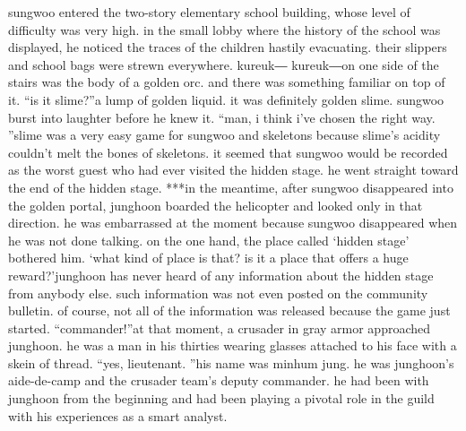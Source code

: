 sungwoo entered the two-story elementary school building, whose level of difficulty was very high.
 in the small lobby where the history of the school was displayed, he noticed the traces of the children hastily evacuating.
 their slippers and school bags were strewn everywhere.
kureuk― kureuk―on one side of the stairs was the body of a golden orc.
 and there was something familiar on top of it.
“is it slime?”a lump of golden liquid.
 it was definitely golden slime.
 sungwoo burst into laughter before he knew it.
“man, i think i’ve chosen the right way.
”slime was a very easy game for sungwoo and skeletons because slime’s acidity couldn’t melt the bones of skeletons.
it seemed that sungwoo would be recorded as the worst guest who had ever visited the hidden stage.
he went straight toward the end of the hidden stage.
***in the meantime, after sungwoo disappeared into the golden portal, junghoon boarded the helicopter and looked only in that direction.
he was embarrassed at the moment because sungwoo disappeared when he was not done talking.
 on the one hand, the place called ‘hidden stage’ bothered him.
‘what kind of place is that? is it a place that offers a huge reward?’junghoon has never heard of any information about the hidden stage from anybody else.
 such information was not even posted on the community bulletin.
of course, not all of the information was released because the game just started.
“commander!”at that moment, a crusader in gray armor approached junghoon.
 he was a man in his thirties wearing glasses attached to his face with a skein of thread.
“yes, lieutenant.
”his name was minhum jung.
 he was junghoon’s aide-de-camp and the crusader team’s deputy commander.
 he had been with junghoon from the beginning and had been playing a pivotal role in the guild with his experiences as a smart analyst.

